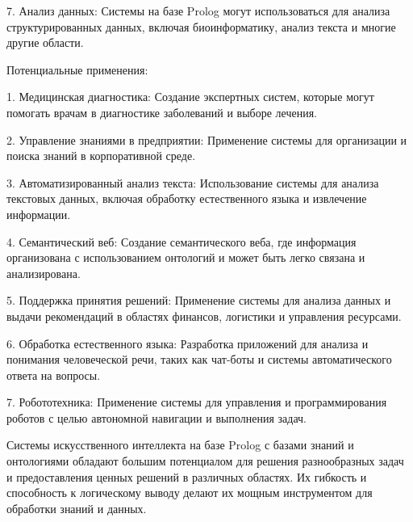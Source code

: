 7. Анализ данных: Системы на базе Prolog могут использоваться для анализа структурированных данных, включая биоинформатику, анализ текста и многие другие области.

Потенциальные применения:

1. Медицинская диагностика: Создание экспертных систем, которые могут помогать врачам в диагностике заболеваний и выборе лечения.

2. Управление знаниями в предприятии: Применение системы для организации и поиска знаний в корпоративной среде.

3. Автоматизированный анализ текста: Использование системы для анализа текстовых данных, включая обработку естественного языка и извлечение информации.

4. Семантический веб: Создание семантического веба, где информация организована с использованием онтологий и может быть легко связана и анализирована.

5. Поддержка принятия решений: Применение системы для анализа данных и выдачи рекомендаций в областях финансов, логистики и управления ресурсами.

6. Обработка естественного языка: Разработка приложений для анализа и понимания человеческой речи, таких как чат-боты и системы автоматического ответа на вопросы.

7. Робототехника: Применение системы для управления и программирования роботов с целью автономной навигации и выполнения задач.

Системы искусственного интеллекта на базе Prolog с базами знаний и онтологиями обладают большим потенциалом для решения разнообразных задач и предоставления ценных решений в различных областях. Их гибкость и способность к логическому выводу делают их мощным инструментом для обработки знаний и данных.